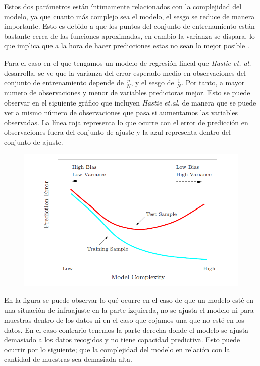 \noindent Estos dos parámetros están íntimamente relacionados con la complejidad del modelo, ya que cuanto más complejo sea el modelo, el sesgo se reduce de manera importante. Esto es debido a que los puntos del conjunto de entrenamiento están bastante cerca de las funciones aproximadas, en cambio la varianza se dispara, lo que implica que a la hora de hacer predicciones estas no sean lo mejor posible \cite{Neural Designer}. 

\noindent Para el caso en el que tengamos un modelo de regresión lineal que \emph{Hastie et. al.} \cite {Hastie 2001} desarrolla, se ve que la varianza del error esperado medio en observaciones del conjunto de entrenamiento depende de $\frac{p}{N}$, y el sesgo de $\frac{1}{N}$. Por tanto, a mayor numero de observaciones y menor de variables predictoras mejor. Esto se puede observar en el siguiente gráfico que incluyen \emph{Hastie et.al.} \cite{Hastie 2001} de manera que se puede ver a mismo número de observaciones que pasa si aumentamos las variables observadas. La línea roja representa lo que ocurre con el error de predicción en observaciones fuera del conjunto de ajuste y la azul representa dentro del conjunto de ajuste. 

\begin{figure}[h]
\centering
\includegraphics[scale=0.5]{Documentos Extra/Imagenes/Bias-Variance-Tradeoff.png}
\end{figure}
 
\noindent En la figura se puede observar lo qué ocurre en el caso de que un modelo esté en una situación de infraajuste en la parte izquierda, no se ajusta el modelo ni para muestras dentro de los datos ni en el caso que cojamos una que no esté en los datos. En el caso contrario tenemos la parte derecha donde el modelo se ajusta demasiado a los datos recogidos y no tiene capacidad predictiva. Esto puede ocurrir por lo siguiente; que la complejidad del modelo en relación con la cantidad de muestras sea demasiada alta. 

